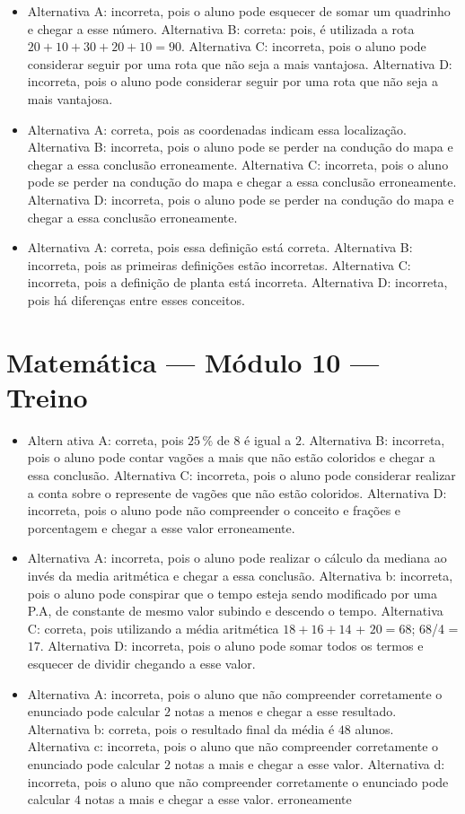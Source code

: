 \begin{itemize}
\item Alternativa A: incorreta, pois o aluno pode esquecer de somar um
quadrinho e chegar a esse número.
Alternativa B: correta: pois, é utilizada a rota $20 + 10 + 30 + 20 + 10 = 90$.
Alternativa C: incorreta, pois o aluno pode considerar seguir por uma
rota que não seja a mais vantajosa.
Alternativa D: incorreta, pois o aluno pode considerar seguir por uma
rota que não seja a mais vantajosa.
\item Alternativa A: correta, pois as coordenadas indicam essa localização.
Alternativa B: incorreta, pois o aluno pode se perder na condução do
mapa e chegar a essa conclusão erroneamente.
Alternativa C: incorreta, pois o aluno pode se perder na condução do
mapa e chegar a essa conclusão erroneamente.
Alternativa D: incorreta, pois o aluno pode se perder na condução do
mapa e chegar a essa conclusão erroneamente.
\item Alternativa A: correta, pois essa definição está correta.
Alternativa B: incorreta, pois as primeiras definições estão incorretas.
Alternativa C: incorreta, pois a definição de planta está incorreta.
Alternativa D: incorreta, pois há diferenças entre esses conceitos.
\end{itemize}

\section*{Matemática — Módulo 10 — Treino}

\begin{itemize}
\item Altern ativa A: correta, pois $25\,\%$ de $8$ é igual a $2$.
Alternativa B: incorreta, pois o aluno pode contar vagões a mais que não
estão coloridos e chegar a essa conclusão.
Alternativa C: incorreta, pois o aluno pode considerar realizar a conta
sobre o represente de vagões que não estão coloridos.
Alternativa D: incorreta, pois o aluno pode não compreender o conceito e
frações e porcentagem e chegar a esse valor erroneamente.
\item Alternativa A: incorreta, pois o aluno pode realizar o cálculo da
mediana ao invés da media aritmética e chegar a essa conclusão.
Alternativa b: incorreta, pois o aluno pode conspirar que o tempo esteja
sendo modificado por uma P.A, de constante de mesmo valor subindo e
descendo o tempo.
Alternativa C: correta, pois utilizando a média aritmética $18 + 16 + 14$
+ $20 = 68$; 68/4 = $17$.
Alternativa D: incorreta, pois o aluno pode somar todos os termos e
esquecer de dividir chegando a esse valor.
\item Alternativa A: incorreta, pois o aluno que não compreender corretamente
o enunciado pode calcular $2$ notas a menos e chegar a esse resultado.
Alternativa b: correta, pois o resultado final da média é $48$ alunos.
Alternativa c: incorreta, pois o aluno que não compreender corretamente
o enunciado pode calcular $2$ notas a mais e chegar a esse valor.
Alternativa d: incorreta, pois o aluno que não compreender corretamente
o enunciado pode calcular $4$ notas a mais e chegar a esse valor.
erroneamente
\end{itemize}

